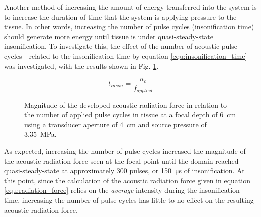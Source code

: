 			Another method of increasing the amount of energy transferred into the system is to increase the duration of time that the system is applying pressure to the tissue. In other words, increasing the number of pulse cycles (insonification time) should generate more energy until tissue is under quasi-steady-state insonification. To investigate this, the effect of the number of acoustic pulse cycles---related to the insonification time by equation \ref{equ:insonification_time}---was investigated, with the results shown in Fig. \ref{fig:pulse_cycles_force}.

			\begin{equation}
			\label{equ:insonification_time}
				t_{inson} = \frac{n_c}{f_{applied}}
			\end{equation}

			\begin{figure}[!htb]
				\centering
				\caption[Magnitude of developed acoustic radiation force in relation to the number of applied pulse cycles]{Magnitude of the developed acoustic radiation force in relation to the number of applied pulse cycles in tissue at a focal depth of \SI{6}{\cm} using a transducer aperture of \SI{4}{\cm} and source pressure of \SI{3.35}{\MPa}.}
				\label{fig:pulse_cycles_force}
			\end{figure}

			As expected, increasing the number of pulse cycles increased the magnitude of the acoustic radiation force seen at the focal point until the domain reached quasi-steady-state at approximately 300 pulses, or \SI{150}{\us} of insonification. At this point, since the calculation of the acoustic radiation force given in equation \ref{equ:radiation_force} relies on the \emph{average} intensity during the insonification time, increasing the number of pulse cycles has little to no effect on the resulting acoustic radiation force.

